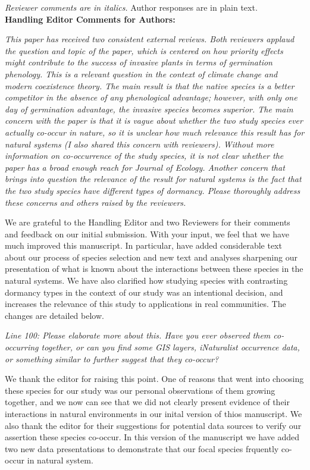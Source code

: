 \documentclass[11pt]{article}
\begin{document}
\emph{Reviewer comments are in italics.} Author responses are in plain text.\\

\textbf{Handling Editor Comments for Authors:}

\emph{This paper has received two consistent external reviews. Both reviewers applaud the question and topic of the paper, which is centered on how priority effects might contribute to the success of invasive plants in terms of germination phenology. This is a relevant question in the context of climate change and modern coexistence theory. The main result is that the native species is a better competitor in the absence of any phenological advantage; however, with only one day of germination advantage, the invasive species becomes superior. The main concern with the paper is that it is vague about whether the two study species ever actually co-occur in nature, so it is unclear how much relevance this result has for natural systems (I also shared this concern with reviewers). Without more information on co-occurrence of the study species, it is not clear whether the paper has a broad enough reach for Journal of Ecology. Another concern that brings into question the relevance of the result for natural systems is the fact that the two study species have different types of dormancy. Please thoroughly address these concerns and others raised by the reviewers. }

We are grateful to the Handling Editor and two Reviewers for their comments and feedback on our initial submission. With your input, we feel that we have much improved this manuscript. In particular, have added considerable text about our process of species selection and new text and analyses sharpening our presentation of what is known about the interactions between these species in the natural systems. We have also clarified how studying species with contrasting dormancy types in the context of our study was an intentional decision, and increases the relevance of this study to applications in real communities.  The changes are detailed below.

\emph{Line 100: Please elaborate more about this. Have you ever observed them co-occurring together, or can you find some GIS layers, iNaturalist occurrence data, or something similar to further suggest that they co-occur?} 

We thank the editor for raising this point. One of reasons that went into choosing these species for our study was our personal observations of them growing together, and we now can see that we did not clearly present evidence of their interactions in natural environments in our inital version of thios manuscript. We also thank the editor for their suggestions for potential data sources to verify our assertion these species co-occur. In this version of the manuscript we have added two new data presentations to demonstrate that our focal species frquently co-occur in natural system.
\end{document}
